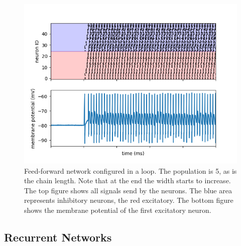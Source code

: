 \documentclass[a4paper,twocolumn]{article}
\begin{document}
\begin{figure}
    \centering
    \includegraphics[width=.5\textwidth]{figures/feedforward signals loop.png}
    \caption{Feed-forward network configured in a loop. The population is 5, as
        is the chain length. Note that at the end the width starts to increase.
        The top figure shows all signals send by the neurons. The blue area
        represents inhibitory neurons, the red excitatory. The bottom figure
        shows the membrane potential of the first excitatory neuron.}
    \label{fig:feed-forward-loop}
\end{figure}

\subsection{Recurrent Networks}
\end{document}
